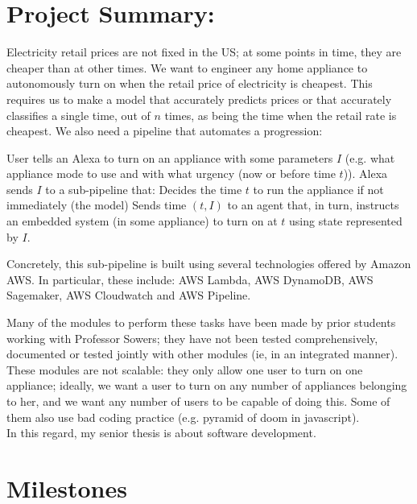 \documentclass[a4paper]{article}
\begin{document}
\section{Project Summary:}

Electricity retail prices are not fixed in the US; at some points in time, they are cheaper than at other times. We want to engineer any home appliance to autonomously turn on when the retail price of electricity is cheapest. This requires us
to make a model that accurately predicts prices or that accurately classifies a single time, out of $n$ times, as being the time when
the retail rate is cheapest. We also need a pipeline that automates a progression:

\begin{outline}
    \1 User tells an Alexa to turn on an appliance with some parameters $I$ (e.g. what appliance mode to use and with what urgency (now or before time $t$)).
    \1 Alexa sends $I$ to a sub-pipeline that:
    \2 Decides the time $t$ to run the appliance if not immediately (the model)
    \2 Sends time $(t,I)$ to an agent that, in turn, instructs an embedded system (in some appliance) to turn on at $t$ using state represented by $I$.
\end{outline}

Concretely, this sub-pipeline is built using several technologies offered by Amazon AWS. In particular, these include: AWS Lambda, AWS DynamoDB, AWS Sagemaker,
AWS Cloudwatch and AWS Pipeline.

\begin{remark}
     Many of the modules to perform these tasks have been made by prior students working with Professor Sowers; they have not been tested comprehensively, documented
     or tested jointly with other modules (ie, in an integrated manner). These modules are not scalable: they only allow one user to turn on one appliance; ideally, we want a user to turn on any number of appliances belonging
     to her, and we want any number of users to be capable of doing this. Some of them also use bad coding practice (e.g. pyramid of doom in javascript). \\

     In this regard, my senior thesis is about software development.
\end{remark}


\section{Milestones}
\end{document}

